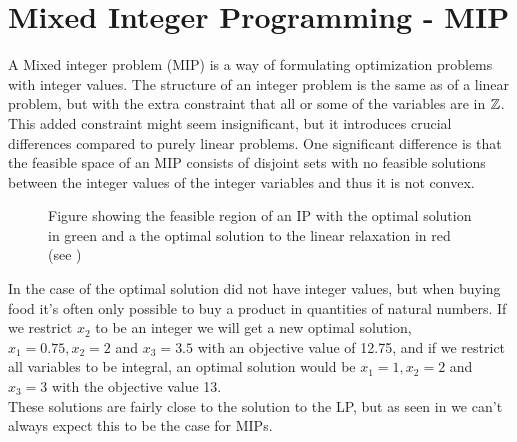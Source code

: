 \section{Mixed Integer Programming - MIP}
A Mixed integer problem (MIP) is a way of formulating optimization problems with integer values. The structure of an integer problem is the same as of a linear problem, but with the extra constraint that all or some of the variables are in $\mathbb{Z}$. This added constraint might seem insignificant, but it introduces crucial differences compared to purely linear problems. One significant difference is that the feasible space of an MIP consists of disjoint sets with no feasible solutions between the integer values of the integer variables and thus it is not convex.
\begin{figure}[H]\label{IP figure}
\centering
{}
\caption{Figure showing the feasible region of an IP with the optimal solution in green and a the optimal solution to the linear relaxation in red (see )}
\end{figure}
\begin{example}
In the case of  the optimal solution did not have integer values, but when buying food it's often only possible to buy a product in quantities of natural numbers. If we restrict $x_2$ to be an integer we will get a new optimal solution, $x_1=0.75, x_2=2$ and $x_3= 3.5$ with an objective value of 12.75, and if we restrict all variables to be integral, an optimal solution would be $x_1=1, x_2=2$ and $x_3= 3$ with the objective value 13.\\
These solutions are fairly close to the solution to the LP, but as seen in  we can't always expect this to be the case for MIPs.
\end{example}
